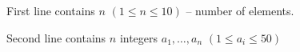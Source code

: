 First line contains $n$ $(1\le n\le 10 )$ -- number of elements.

Second line contains $n$ integers $a_1,\dots,a_n$ $(1\le a_i \le 50)$
